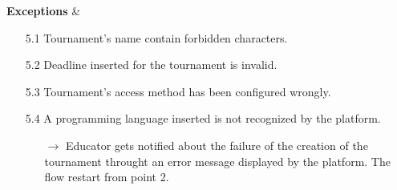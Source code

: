 \documentclass{article}
\begin{document}
{\begin{enumerate}
\begin{xltabular}{\textwidth}
                        \hline
                        \textbf{Exceptions} &    \begin{itemize}
                                                    \item[5.1] Tournament's name contain forbidden characters.
                                                    \item[5.2] Deadline inserted for the tournament is invalid. 
                                                    \item[5.3] Tournament's access method has been configured wrongly.
                                                    \item[5.4] A programming language inserted is not recognized by the platform. 
                                                    \begin{itemize}
                                                        \item[$\rightarrow$] Educator gets notified about the failure of the creation of the tournament
                                                        throught an error message displayed by the platform. The flow restart from point 2.
                                                    \end{itemize} 
                                                \end{itemize}
                    \end{xltabular}
                    

\end{enumerate}}
\end{document}
